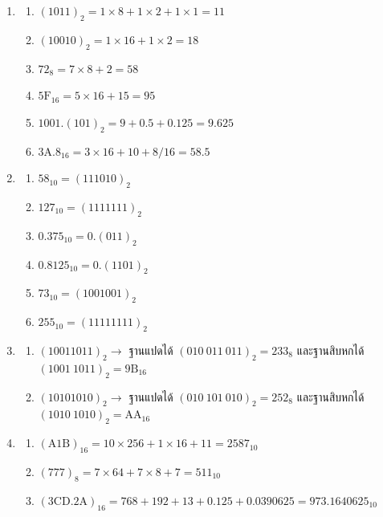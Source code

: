 \answerkeyhead
{}
\begin{enumerate}[series=anskey,label={},leftmargin=0pt,itemsep=0.6em]
    \item
    \begin{enumerate}[label=\textbf{\thechapter.\arabic{enumi}.\arabic*}]
        \item $(1011)_2 = 1 \times 8 + 1 \times 2 + 1 \times 1 = 11$
        \item $(10010)_2 = 1 \times 16 + 1 \times 2 = 18$
        \item $72_8 = 7 \times 8 + 2 = 58$
        \item $5\mathrm{F}_{16} = 5 \times 16 + 15 = 95$
        \item $1001.(101)_2 = 9 + 0.5 + 0.125 = 9.625$
        \item $3\mathrm{A}.8_{16} = 3 \times 16 + 10 + 8/16 = 58.5$
    \end{enumerate}

    \item
    \begin{enumerate}[label=\textbf{\thechapter.\arabic{enumi}.\arabic*}]
        \item $58_{10} = (111010)_2$
        \item $127_{10} = (1111111)_2$
        \item $0.375_{10} = 0.(011)_2$
        \item $0.8125_{10} = 0.(1101)_2$
        \item $73_{10} = (1001001)_2$
        \item $255_{10} = (11111111)_2$
    \end{enumerate}

    \item
    \begin{enumerate}[label=\textbf{\thechapter.\arabic{enumi}.\arabic*}]
        \item $(10011011)_2 \to$ ฐานแปดได้ $(010\ 011\ 011)_2 = 233_8$ และฐานสิบหกได้ $(1001\ 1011)_2 = 9\mathrm{B}_{16}$
        \item $(10101010)_2 \to$ ฐานแปดได้ $(010\ 101\ 010)_2 = 252_8$ และฐานสิบหกได้ $(1010\ 1010)_2 = \mathrm{AA}_{16}$
    \end{enumerate}

    \item
    \begin{enumerate}[label=\textbf{\thechapter.\arabic{enumi}.\arabic*}]
        \item $(\mathrm{A}1\mathrm{B})_{16} = 10 \times 256 + 1 \times 16 + 11 = 2587_{10}$
        \item $(777)_8 = 7 \times 64 + 7 \times 8 + 7 = 511_{10}$
        \item $(3\mathrm{CD}.2\mathrm{A})_{16} = 768 + 192 + 13 + 0.125 + 0.0390625 = 973.1640625_{10}$
    \end{enumerate}
\end{enumerate}

